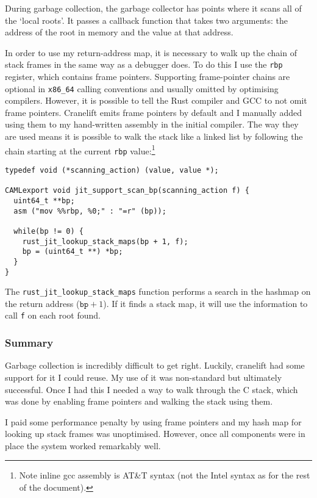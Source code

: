 During garbage collection, the garbage collector has points where it scans all of the `local
roots'. It passes a callback function that takes two arguments: the address of the root in
memory
and the value at that address.

In order to use my return-address map, it is necessary to walk up the chain of stack frames in the
same way as a debugger does. To do this I use the \texttt{rbp} register, which contains frame
pointers. Supporting frame-pointer chains are optional in \texttt{x86\_64} calling conventions and
usually omitted by optimising compilers. However, it is possible to tell the Rust compiler and GCC
to not omit frame pointers. Cranelift emits frame pointers by default and I manually added using
them to my hand-written assembly in the initial compiler.
The way they are used means it is possible to walk the stack like a linked list by following the
chain starting at the current \texttt{rbp} value:\footnote{Note inline gcc assembly is AT\&T syntax
      (not the Intel syntax as for the rest of the
      document).}

\begin{verbatim}
typedef void (*scanning_action) (value, value *);

CAMLexport void jit_support_scan_bp(scanning_action f) {
  uint64_t **bp;
  asm ("mov %%rbp, %0;" : "=r" (bp));

  while(bp != 0) {
    rust_jit_lookup_stack_maps(bp + 1, f);
    bp = (uint64_t **) *bp;
  }
}
\end{verbatim}

The \texttt{rust\_jit\_lookup\_stack\_maps} function performs a search in the hashmap on the return
address
($\texttt{bp} + 1$). If it finds a stack map, it will use the information to call \texttt{f} on
each root found.

\subsubsection{Summary}

Garbage collection is incredibly difficult to get right. Luckily, cranelift had some support for it
I could reuse. My use of it was non-standard but ultimately successful. Once I had this I needed a
way to walk through the C stack, which was done by enabling frame pointers and walking the stack
using them.

I paid some performance penalty by using frame pointers and my hash map for looking up stack frames
was unoptimised. However, once all components were in place the system worked remarkably well.

